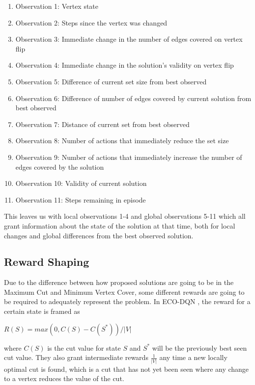 \documentclass{article}
\begin{document}
\begin{enumerate}
    \item Observation 1: Vertex state
    \item Observation 2: Steps since the vertex was changed 
    \item Observation 3: Immediate change in the number of edges covered on vertex flip 
    \item Observation 4: Immediate change in the solution's validity on vertex flip 
    \item Observation 5: Difference of current set size from best observed 
    \item Observation 6: Difference of number of edges covered by current solution from best observed 
    \item Observation 7: Distance of current set from best observed 
    \item Observation 8: Number of actions that immediately reduce the set size
    \item Observation 9: Number of actions that immediately increase the number of edges covered by the solution 
    \item Observation 10: Validity of current solution 
    \item Observation 11: Steps remaining in episode 
\end{enumerate}

This leaves us with local observations 1-4 and global observations 5-11 which all grant information about the state of the solution at that time, both for local changes and global differences from the best observed solution.

\subsection{Reward Shaping}

Due to the difference between how proposed solutions are going to be in the Maximum Cut and Minimum Vertex Cover, some different rewards are going to be required to adequately represent the problem. In ECO-DQN \cite{eco-dqn}, the reward for a certain state is framed as

$R(S) = max(0, C(S) - C(S^*)) / |V|$

where $C(S)$ is the cut value for state $S$ and $S^*$ will be the previously best seen cut value. They also grant intermediate rewards $\frac{1}{|V|}$ any time a new locally optimal cut is found, which is a cut that has not yet been seen where any change to a vertex reduces the value of the cut.
\end{document}

